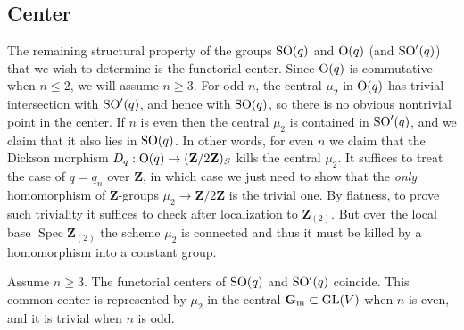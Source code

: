 \documentclass[10pt]{article}
\renewcommand{\(}{\left(}
\renewcommand{\)}{\right)}
\newcommand{\Spec}{\operatorname{Spec}}
\numberwithin{thm}{subsection}
\begin{document}
\subsection{Center}

The remaining structural property of the groups
${\rm{SO}}(q)$ and ${\rm{O}}(q)$ (and ${\rm{SO}}'(q)$) that
we wish to determine is the functorial center.
Since ${\rm{O}}(q)$ is commutative when $n \le 2$, we will assume
$n \ge 3$.  For odd $n$, the central $\mu_2$ in
${\rm{O}}(q)$ has trivial intersection with
${\rm{SO}}'(q)$, and hence with ${\rm{SO}}(q)$,
so there is no obvious nontrivial point in the center.
If $n$ is even then the central $\mu_2$ is contained
in ${\rm{SO}}'(q)$, and we claim that it also
lies in ${\rm{SO}}(q)$.  In other words, for even $n$ 
we claim that the Dickson morphism
$D_q:{\rm{O}}(q) \rightarrow ({\mathbf{Z}}/2{\mathbf{Z}})_S$ kills
the central $\mu_2$.  It suffices
to treat the case of $q = q_n$ over ${\mathbf{Z}}$, in which case
we just need to show that the {\em only}
homomorphism of ${\mathbf{Z}}$-groups $\mu_2 \rightarrow {\mathbf{Z}}/2{\mathbf{Z}}$ is the trivial one.
By flatness, to prove such triviality it suffices
to check after localization to ${\mathbf{Z}}_{(2)}$.
But over the local base $\Spec {\mathbf{Z}}_{(2)}$ the scheme $\mu_2$ is connected
and thus it must be killed by a homomorphism into a constant group.

\begin{prop}\label{findcenter} Assume $n \ge 3$.
The functorial centers of ${\rm{SO}}(q)$ and ${\rm{SO}}'(q)$ coincide.
This common center is represented by
$\mu_2$ in the central ${\mathbf{G}}_{\rm{m}} \subset {\rm{GL}}(V)$ when $n$ is even,
and it is trivial when $n$ is odd.
\end{prop} 
\end{document}
